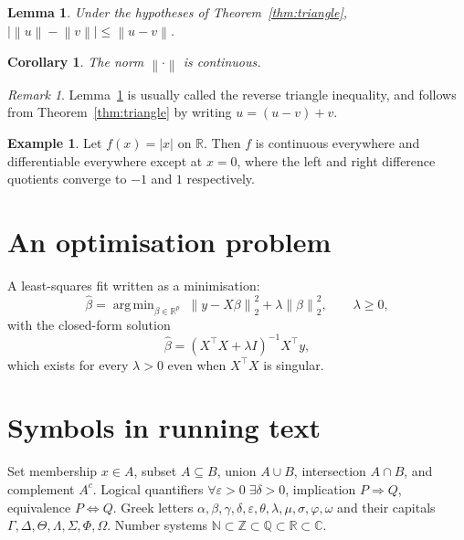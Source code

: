 \documentclass[11pt,a4paper]{article}
\theoremstyle{plain}
\newtheorem{lemma}[theorem]{Lemma}
\newtheorem{corollary}[theorem]{Corollary}
\theoremstyle{definition}
\newtheorem{example}[theorem]{Example}
\theoremstyle{remark}
\newtheorem*{remark}{Remark}
\newcommand{\R}{\mathbb{R}}
\newcommand{\N}{\mathbb{N}}
\newcommand{\C}{\mathbb{C}}
\newcommand{\norm}[1]{\left\lVert #1 \right\rVert}
\newcommand{\abs}[1]{\left\lvert #1 \right\rvert}
\DeclareMathOperator*{\argmin}{arg\,min}
\begin{document}
\begin{lemma}
\label{lem:reverse}
Under the hypotheses of Theorem~\ref{thm:triangle},
$\bigl\lvert \norm{u} - \norm{v} \bigr\rvert \le \norm{u - v}$.
\end{lemma}

\begin{corollary}
The norm $\norm{\cdot}$ is continuous.
\end{corollary}

\begin{remark}
Lemma~\ref{lem:reverse} is usually called the reverse triangle inequality, and
follows from Theorem~\ref{thm:triangle} by writing $u = (u - v) + v$.
\end{remark}

\begin{example}
Let $f(x) = \abs{x}$ on $\R$. Then $f$ is continuous everywhere and
differentiable everywhere except at $x = 0$, where the left and right difference
quotients converge to $-1$ and $1$ respectively.
\end{example}

\section{An optimisation problem}

A least-squares fit written as a minimisation:
\begin{equation}
  \hat{\beta} = \argmin_{\beta \in \R^{p}}
    \; \norm{y - X\beta}_{2}^{2} + \lambda \norm{\beta}_{2}^{2},
  \qquad \lambda \ge 0,
\end{equation}
with the closed-form solution
\[
  \hat{\beta} = \left( X^{\top}X + \lambda I \right)^{-1} X^{\top} y ,
\]
which exists for every $\lambda > 0$ even when $X^{\top}X$ is singular.

\section{Symbols in running text}

Set membership $x \in A$, subset $A \subseteq B$, union $A \cup B$, intersection
$A \cap B$, and complement $A^{c}$. Logical quantifiers
$\forall \varepsilon > 0 \; \exists \delta > 0$, implication
$P \Rightarrow Q$, equivalence $P \iff Q$. Greek letters
$\alpha, \beta, \gamma, \delta, \varepsilon, \theta, \lambda, \mu, \sigma,
\varphi, \omega$ and their capitals $\Gamma, \Delta, \Theta, \Lambda, \Sigma,
\Phi, \Omega$. Number systems $\N \subset \mathbb{Z} \subset \mathbb{Q}
\subset \R \subset \C$.
\end{document}
